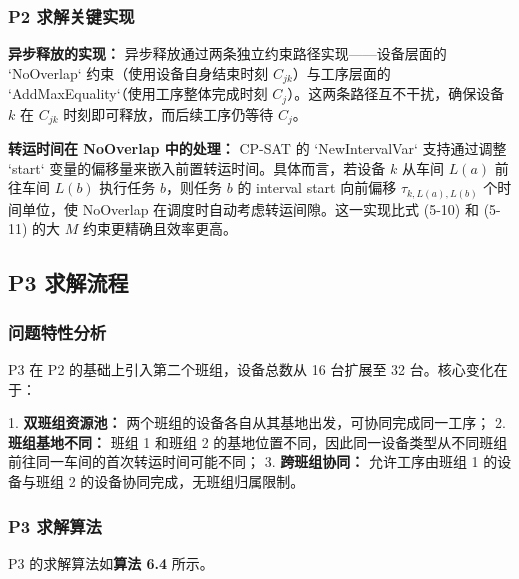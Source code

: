 \documentclass[UTF8,a4paper,12pt]{ctexart}
\begin{document}
\subsubsection{P2 求解关键实现}
\textbf{异步释放的实现：} 异步释放通过两条独立约束路径实现——设备层面的 `NoOverlap` 约束（使用设备自身结束时刻 $C_{jk}$）与工序层面的 `AddMaxEquality`（使用工序整体完成时刻 $C_j$）。这两条路径互不干扰，确保设备 $k$ 在 $C_{jk}$ 时刻即可释放，而后续工序仍等待 $C_j$。

\textbf{转运时间在 NoOverlap 中的处理：} CP-SAT 的 `NewIntervalVar` 支持通过调整 `start` 变量的偏移量来嵌入前置转运时间。具体而言，若设备 $k$ 从车间 $L(a)$ 前往车间 $L(b)$ 执行任务 $b$，则任务 $b$ 的 interval start 向前偏移 $\tau_{k,L(a),L(b)}$ 个时间单位，使 NoOverlap 在调度时自动考虑转运间隙。这一实现比式 (5-10) 和 (5-11) 的大 $M$ 约束更精确且效率更高。

\subsection{P3 求解流程}
\subsubsection{问题特性分析}
P3 在 P2 的基础上引入第二个班组，设备总数从 16 台扩展至 32 台。核心变化在于：

1. \textbf{双班组资源池：} 两个班组的设备各自从其基地出发，可协同完成同一工序；
2. \textbf{班组基地不同：} 班组 1 和班组 2 的基地位置不同，因此同一设备类型从不同班组前往同一车间的首次转运时间可能不同；
3. \textbf{跨班组协同：} 允许工序由班组 1 的设备与班组 2 的设备协同完成，无班组归属限制。

\subsubsection{P3 求解算法}
P3 的求解算法如\textbf{算法 6.4} 所示。
\end{document}
